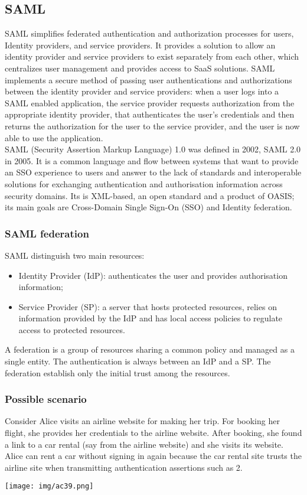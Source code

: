 \documentclass[a4paper, 10pt, titlepage]{article}
\begin{document}
\subsection{SAML}
SAML simplifies federated authentication and authorization processes for users, Identity providers, and service providers. It provides a solution to allow an identity provider and service providers to exist separately from each other, which centralizes user management and provides access to SaaS solutions. SAML implements a secure method of passing user authentications and authorizations between the identity provider and service providers: when a user logs into a SAML enabled application, the service provider requests authorization from the appropriate identity provider, that authenticates the user’s credentials and then returns the authorization for the user to the service provider, and the user is now able to use the application. \medskip\\
SAML (Security Assertion Markup Language) 1.0 was defined in 2002, SAML 2.0 in 2005. It is a common language and flow between systems that want to provide an SSO experience to users and answer to the lack of standards and interoperable solutions for exchanging authentication and authorisation information across security domains. Its is XML-based, an open standard and a product of OASIS; its main goals are Cross-Domain Single Sign-On (SSO) and Identity federation.

\subsubsection{SAML federation}
SAML distinguish two main resources:
\begin{itemize}
\item Identity Provider (IdP): authenticates the user and provides authorisation information;
\item Service Provider (SP): a server that hosts protected resources, relies on information provided by the IdP and has local access policies to regulate access to protected resources.
\end{itemize}
A federation is a group of resources sharing a common policy and managed as a single entity. The authentication is always between an IdP and a SP. The federation establish only the initial trust among the resources.

\subsubsection*{Possible scenario}
Consider Alice visits an airline website for making her trip. For booking her flight, she provides her credentials to the airline website. After booking, she found a link to a car rental (say from the airline website) and she visits its website. Alice can rent a car without signing in again because the car rental site trusts the airline site when transmitting authentication assertions such as 2.
\begin{center}
\texttt{[image: img/ac39.png]}
\end{center}
\end{document}
